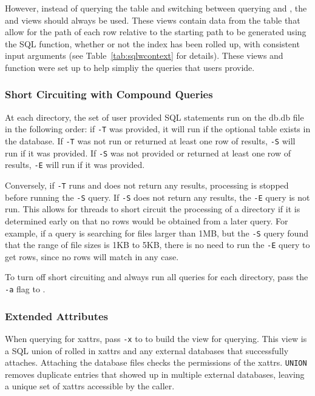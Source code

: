 However, instead of querying the \summary table and switching between
querying \entries and \pentries, the \vrpentries and \vrsummary views
should always be used. These views contain data from the \summary
table that allow for the path of each row relative to the starting
path to be generated using the \rpath SQL function, whether or not the
index has been rolled up, with consistent input arguments (see
Table~\ref{tab:sqlwcontext} for details). These views and function
were set up to help simpliy the queries that users provide.

\subsubsection{Short Circuiting with Compound Queries}
At each directory, the set of user provided SQL statements run on the
db.db file in the following order: if \texttt{-T} was provided, it
will run if the optional \treesummary table exists in the database. If
\texttt{-T} was not run or returned at least one row of results,
\texttt{-S} will run if it was provided. If \texttt{-S} was not
provided or returned at least one row of results, \texttt{-E} will run
if it was provided.

Conversely, if \texttt{-T} runs and does not return any results,
processing is stopped before running the \texttt{-S} query. If
\texttt{-S} does not return any results, the \texttt{-E} query is not
run. This allows for threads to short circuit the processing of a
directory if it is determined early on that no rows would be obtained
from a later query. For example, if a query is searching for files
larger than 1MB, but the \texttt{-S} query found that the range of
file sizes is 1KB to 5KB, there is no need to run the \texttt{-E}
query to get rows, since no rows will match in any case.

To turn off short circuiting and always run all queries for each
directory, pass the \texttt{-a} flag to \gufiquery.

\subsubsection{Extended Attributes}
When querying for xattrs, pass \texttt{-x} to \gufiquery to build the
\xattrs view for querying. This view is a SQL union of rolled in
xattrs and any external databases that successfully
attaches. Attaching the database files checks the permissions of the
xattrs. \texttt{UNION} removes duplicate entries that showed up in
multiple external databases, leaving a unique set of xattrs accessible
by the caller.

